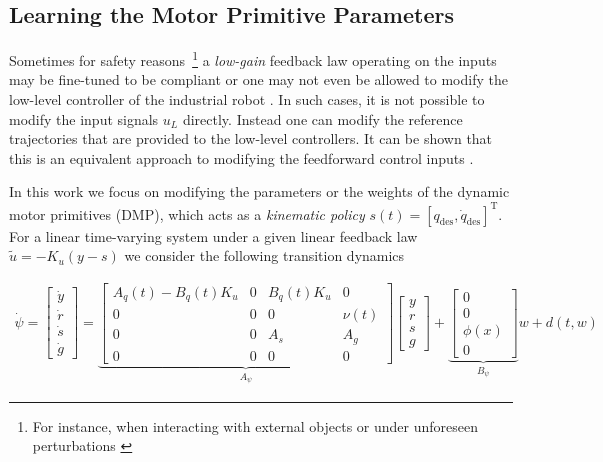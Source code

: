 \documentclass[10pt,a4paper]{article}
\newcommand{\joint}{q} %
\newcommand{\state}{y} %
\newcommand{\dmp}{s} %
\newcommand{\traj}{r} %
\newcommand{\linDist}{d} %
\newcommand{\sysInput}{u} %
\newcommand{\linInput}{\tilde{u}} %
\newcommand{\fullvec}{\psi} %
\newcommand{\phase}{x} %
\newcommand{\weights}{w} %
\newcommand{\basis}{\phi} %
\begin{document}
\subsection{Learning the Motor Primitive Parameters}\label{learningMPs}

Sometimes for safety reasons~\footnote{For instance, when interacting with external objects or under unforeseen perturbations \cite{Schaal07}} a \emph{low-gain} feedback law operating on the inputs may be fine-tuned to be compliant or one may not even be allowed to modify the low-level controller of the industrial robot \cite{Longman2000}. In such cases, it is not possible to modify the input signals $\sysInput_L$ directly. Instead one can modify the reference trajectories that are provided to the low-level controllers. It can be shown that this is an equivalent approach to modifying the feedforward control inputs \cite{Bristow06}.

In this work we focus on modifying the parameters or the weights of the dynamic motor primitives (DMP), which acts as a \emph{kinematic policy} $\dmp(t) = [\joint_{\text{des}},\dot{\joint}_{\text{des}}]^{\mathrm{T}}$. For a linear time-varying system under a given linear feedback law $\linInput = -K_u(\state - \dmp)$ we consider the following transition dynamics

\begin{equation}
\begin{aligned}
 \dot{\fullvec} = 
 \begin{bmatrix}
  \dot{\state} \\
  \dot{\traj} \\
  \dot{\dmp} \\
  \dot{g}
 \end{bmatrix} = 
 \underbrace{\begin{bmatrix}
  A_q(t) - B_q(t)K_u & 0 & B_q(t)K_u & 0 \\
  0 & 0 & 0 & \nu(t) \\
  0  & 0  & A_s & A_g  \\
  0 & 0 & 0 & 0
 \end{bmatrix}}_{A_{\fullvec}}
 \begin{bmatrix}
   \state \\
   \traj \\
   \dmp \\
   g
  \end{bmatrix} +
  \underbrace{\begin{bmatrix}
    0 \\
    0 \\
    \basis(\phase) \\
    0
   \end{bmatrix}}_{B_{\fullvec}} \weights + \linDist(t,\weights)
\end{aligned}
\label{fullTransition}
\end{equation}
\end{document}
